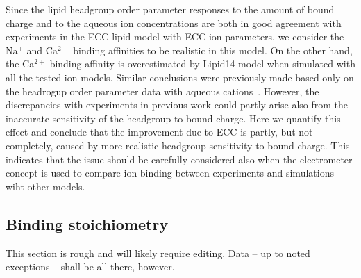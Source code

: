 \documentclass[aip,jcp,twocolumn]{revtex4}
\begin{document}
Since the lipid headgroup order parameter responses to the amount of bound charge
and to the aqueous ion concentrations are both in good agreement with experiments
in the ECC-lipid model with ECC-ion parameters, we consider the Na$^+$ and Ca$^{2+}$
binding affinities to be realistic in this model. On the other hand, the Ca$^{2+}$
binding affinity is overestimated by Lipid14 model when simulated with all the
tested ion models. Similar conclusions were previously made based only on the headrogup
order parameter data with aqueous cations~\cite{catte16}. However,
the discrepancies with experiments in previous work could partly arise also from
the inaccurate sensitivity of the headgroup to bound charge. Here we quantify this
effect and conclude that the improvement due to ECC is partly, but not completely,
caused by more realistic headgroup sensitivity to bound charge.
This indicates that the issue should be carefully considered also when
the electrometer concept is used to compare ion binding between experiments
and simulations wiht other models.





\subsection{Binding stoichiometry}


This section is rough and will likely require editing. 
Data -- up to noted exceptions -- shall be all there, however. 
\end{document}
